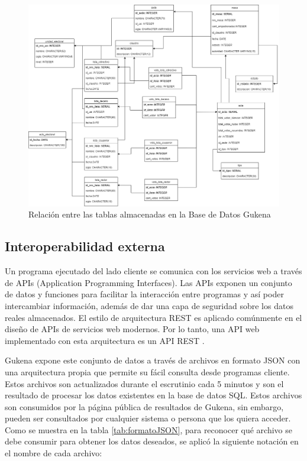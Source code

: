 \begin{figure}[h!]
  \includegraphics[width=\textwidth]{img/merGukena.png}
  \caption{Relación entre las tablas almacenadas en la Base de Datos Gukena}
  \label{graf:diagramaBD}
\end{figure}

\subsection{Interoperabilidad externa}

Un programa ejecutado del lado cliente se comunica con los servicios web a través de APIs (Application Programming Interfaces). Las APIs exponen un conjunto de datos y funciones para facilitar la interacción entre programas y así poder intercambiar información, además de dar una capa de seguridad sobre los datos reales almacenados. El estilo de arquitectura REST es aplicado comúnmente en el diseño de APIs de servicios web modernos. Por lo tanto, una API web implementado con esta arquitectura es un API REST \cite{masse2011rest}.

Gukena expone este conjunto de datos a través de archivos en formato JSON con una arquitectura propia que permite su fácil consulta desde programas cliente. Estos archivos son actualizados durante el escrutinio cada 5 minutos y son el resultado de procesar los datos existentes en la base de datos SQL. Estos archivos son consumidos por la página pública de resultados de Gukena, sin embargo, pueden ser consultados por cualquier sistema o persona que los quiera acceder. 
Como se muestra en la tabla \ref{tab:formatoJSON}, para reconocer qué archivo se debe consumir para obtener los datos deseados,  se aplicó la siguiente notación en el nombre de cada archivo:  


